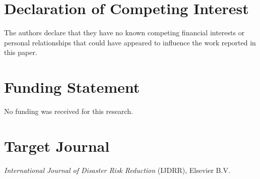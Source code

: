 \documentclass[11pt,a4paper]{article}
\begin{document}
\section*{Declaration of Competing Interest}
The authors declare that they have no known competing financial interests or personal relationships that could have appeared to influence the work reported in this paper.

\vspace{1.5em}

\section*{Funding Statement}
No funding was received for this research.

\vspace{1.5em}

\section*{Target Journal}
\textit{International Journal of Disaster Risk Reduction} (IJDRR), Elsevier B.V.
\end{document}
